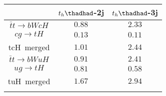 \centering
\begin{tabular}{ccc} \toprule\toprule
 & $t_{h}\thadhad$-2j& $t_{h}\thadhad$-3j\\\midrule
$\bar{t}t\to bWcH$ & $0.88$   & $2.33$   \\
$cg\to tH$         & $0.13$   & $0.11$   \\
tcH~merged         & $1.01$   & $2.44$   \\
$\bar{t}t\to bWuH$ & $0.91$   & $2.41$   \\
$ug\to tH$         & $0.81$   & $0.58$   \\
tuH~merged         & $1.67$   & $2.94$   \\
\bottomrule\bottomrule\\
\end{tabular}